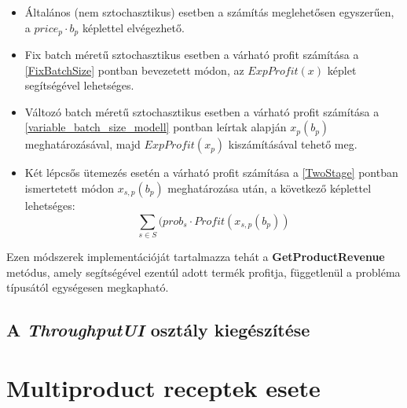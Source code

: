 \begin{itemize}
\item Általános (nem sztochasztikus) esetben a számítás meglehetősen egyszerűen, a $price_p \cdot b_p$ képlettel elvégezhető.
\item Fix batch méretű sztochasztikus esetben a várható profit számítása a \ref{FixBatchSize} pontban bevezetett módon, az $ExpProfit(x)$ képlet segítségével lehetséges.
\item Változó batch méretű sztochasztikus esetben a várható profit számítása a \ref{variable_batch_size_modell} pontban leírtak alapján $x_p(b_p)$ meghatározásával, majd $ExpProfit(x_p)$ kiszámításával tehető meg.
\item Két lépcsős ütemezés esetén a várható profit számítása a \ref{TwoStage} pontban ismertetett módon $x_{s,p}(b_p)$  meghatározása után, a következő képlettel lehetséges:
$$ \sum_{s \in S}(prob_s \cdot Profit(x_{s,p}(b_p))$$ 
\end{itemize}
Ezen módszerek implementációját tartalmazza tehát a \textbf{GetProductRevenue} metódus, amely segítségével ezentúl adott termék profitja, függetlenül a probléma típusától egységesen megkapható.
\subsection{A \textit{ThroughputUI} osztály kiegészítése}
\section{Multiproduct receptek esete} \label{extended_multiproduct}